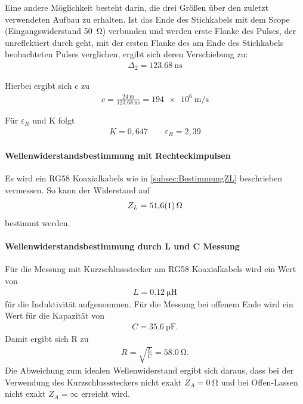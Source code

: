 \documentclass[a4paper,twoside,final]{article}
\begin{document}
Eine andere Möglichkeit besteht darin, die drei Größen über den zuletzt verwendeten Aufbau zu erhalten. Ist das Ende des Stichkabels mit dem Scope (Eingangswiderstand \SI{50}{\ohm}) verbunden und werden erste Flanke des Pulses, der unreflektiert durch geht, mit der ersten Flanke des am Ende des Stichkabels beobachteten Pulses verglichen, ergibt sich deren Verschiebung zu:
\begin{align}
\Delta_2  = \SI{123,68}{\nano\second}
\end{align}

Hierbei ergibt sich c zu
\begin{align}
c = \frac{\SI{24}{\metre}}{\SI{123,68}{\nano\second}}= \SI{194e6}{\metre\per\second}
\end{align}

Für $\varepsilon_R$ und K folgt
\begin{align}
K = 0,647 \qquad \varepsilon_R = 2,39
\end{align}

\paragraph{Wellenwiderstandsbestimmung mit Rechteckimpulsen}
Es wird ein RG58 Koaxialkabels wie in \ref{subsec:BestimmungZL} beschrieben vermessen. So kann der Widerstand auf
\begin{align}
Z_L = \SI{51,6 \pm 0,1}{\ohm}
\end{align}
bestimmt werden.

\paragraph{Wellenwiderstandsbestimmung durch L und C Messung}
Für die Messung mit Kurzschlussstecker am RG58 Koaxialkabels wird ein Wert von
\begin{align}
L = \SI{0,12}{\micro\henry}
\end{align}
für die Induktivität aufgenommen. Für die Messung bei offenem Ende wird ein Wert für die Kapazität von
\begin{align}
C = \SI{35,6}{\pico\farad}.
\end{align}
Damit ergibt sich R zu
\begin{align}
R = \sqrt{\frac{L}{C}} =  \SI{58,0}{\ohm}.
\end{align}
Die Abweichung zum idealen Wellenwiderstand ergibt sich daraus, dass bei der Verwendung des Kurzschlusssteckers nicht exakt $Z_A = \SI{0}{\ohm}$ und bei Offen-Lassen nicht exakt $Z_A = \infty$ erreicht wird.
\end{document}
